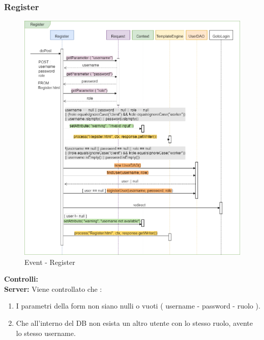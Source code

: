 \documentclass[a4paper, 12pt]{article}
\begin{document}
\subsubsection{Register}
\begin{figure}[h!]
	\centering
	\includegraphics[width=1\textwidth]{PureHTML_images/Register.png}
	\caption{Event - Register}
	\label{figure:register_sd}
\end{figure}
\noindent \textbf{Controlli:}\\
\noindent \textbf{Server:} 
\noindent Viene controllato che :
\begin{enumerate}
\item I parametri della form non siano nulli o vuoti ( username - password - ruolo ).
\item Che all'interno del DB non esista un altro utente con lo stesso ruolo, avente lo stesso username.
\end{enumerate}
\end{document}
